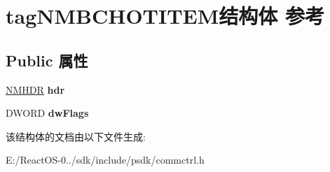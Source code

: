\hypertarget{structtag_n_m_b_c_h_o_t_i_t_e_m}{}\section{tag\+N\+M\+B\+C\+H\+O\+T\+I\+T\+E\+M结构体 参考}
\label{structtag_n_m_b_c_h_o_t_i_t_e_m}
\subsection*{Public 属性}
\begin{DoxyCompactItemize}
\item 
\mbox{\label{structtag_n_m_b_c_h_o_t_i_t_e_m_a0df999ed9830a729b96df023cceca3a8}} 
\hyperlink{structtag_n_m_h_d_r}{N\+M\+H\+DR} {\bfseries hdr}
\item 
\mbox{\label{structtag_n_m_b_c_h_o_t_i_t_e_m_ad016bae97ca12e64181736bc6195ba85}} 
D\+W\+O\+RD {\bfseries dw\+Flags}
\end{DoxyCompactItemize}


该结构体的文档由以下文件生成\+:\begin{DoxyCompactItemize}
\item 
E\+:/\+React\+O\+S-\/0../sdk/include/psdk/commctrl.\+h\end{DoxyCompactItemize}
